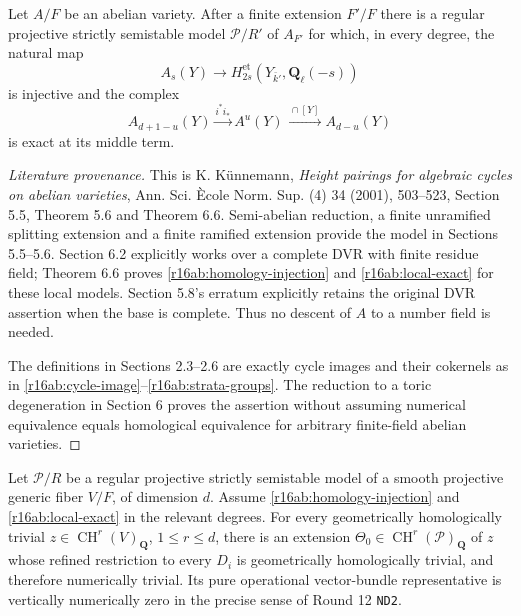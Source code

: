 \begin{proposition}
\label{r16ab:published}
Let $A/F$ be an abelian variety.  After a finite extension $F'/F$
there is a regular projective strictly semistable model
$\mathcal P/R'$ of $A_{F'}$ for which, in every degree, the natural map
\[
                 A_s(Y)\longrightarrow
              H^{\mathrm{et}}_{2s}(Y_{\bar k'},\mathbf Q_\ell(-s))
 \tag{AB16.3}\label{r16ab:homology-injection}
\]
is injective and the complex
\[
 A_{d+1-u}(Y)\xrightarrow{i^*i_*}A^u(Y)
                 \xrightarrow{\ \cap[Y]\ }A_{d-u}(Y)
 \tag{AB16.4}\label{r16ab:local-exact}
\]
is exact at its middle term.
\end{proposition}

\begin{proof}[Literature provenance]
This is K. K\"unnemann, \emph{Height pairings for algebraic cycles on
abelian varieties}, Ann. Sci. \`Ecole Norm. Sup. (4) 34 (2001),
503--523, Section 5.5, Theorem 5.6 and Theorem 6.6.
Semi-abelian reduction, a finite unramified splitting extension and a
finite ramified extension provide the model in Sections 5.5--5.6.
Section 6.2 explicitly works over a complete DVR with finite residue
field; Theorem 6.6 proves \eqref{r16ab:homology-injection} and
\eqref{r16ab:local-exact} for these local models.  Section 5.8's
erratum explicitly retains the original DVR assertion when the base
is complete.  Thus no descent of $A$ to a number field is needed.

The definitions in Sections 2.3--2.6 are exactly cycle images and
their cokernels as in \eqref{r16ab:cycle-image}--\eqref{r16ab:strata-groups}.
The reduction to a toric degeneration in Section 6 proves the assertion
without assuming numerical equivalence equals homological equivalence
for arbitrary finite-field abelian varieties.
\end{proof}

\begin{lemma}
\label{r16ab:numerical-witness}
Let $\mathcal P/R$ be a regular projective strictly semistable model
of a smooth projective generic fiber $V/F$, of dimension $d$.
Assume \eqref{r16ab:homology-injection} and
\eqref{r16ab:local-exact} in the relevant degrees.
For every geometrically homologically trivial
$z\in\operatorname{CH}^r(V)_{\mathbf Q}$, $1\le r\le d$,
there is an extension $\Theta_0\in\operatorname{CH}^r(\mathcal P)_{\mathbf Q}$
of $z$ whose refined restriction to every $D_i$ is geometrically
homologically trivial, and therefore numerically trivial.
Its pure operational vector-bundle representative is vertically
numerically zero in the precise sense of Round 12 \texttt{ND2}.
\end{lemma}

